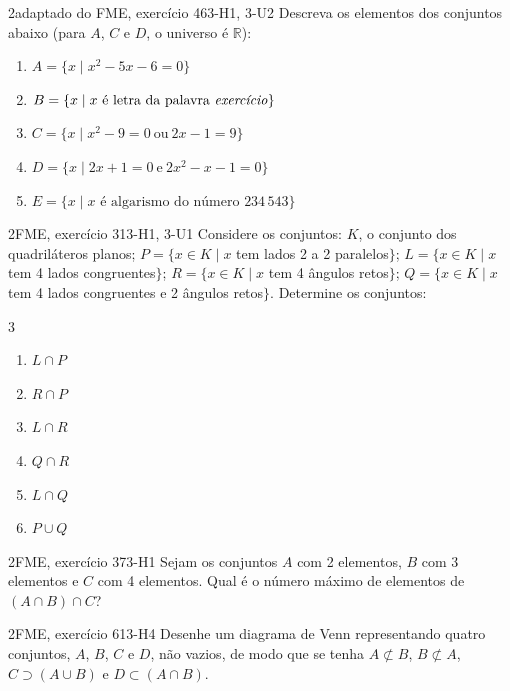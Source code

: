 \begin{questao}[integradora]{2}{adaptado do FME, exercício 46}{3-H1, 3-U2}\label{u3:fme46}
Descreva os elementos dos conjuntos abaixo (para $A$, $C$ e $D$, o universo é $\mathbb{R}$):
\begin{enumerate}[label={}, leftmargin=1.2em, itemsep=1pt]
  \item $A=\{x\mid x^2-5x-6=0\}$
  \item $B=\{x\mid x\text{ é letra da palavra \emph{exercício}}\}$
  \item $C=\{x\mid x^2-9=0\ \text{ou}\ 2x-1=9\}$
  \item $D=\{x\mid 2x+1=0\ \text{e}\ 2x^2-x-1=0\}$
  \item $E=\{x\mid x\text{ é algarismo do número }234\,543\}$
\end{enumerate}
\end{questao}

\begin{questao}[integradora]{2}{FME, exercício 31}{3-H1, 3-U1}\label{u3:fme31}
Considere os conjuntos: $K$, o conjunto dos quadriláteros planos; $P=\{x\in K\mid x$ tem lados 2 a 2 paralelos$\}$; $L=\{x\in K\mid x$ tem 4 lados congruentes$\}$; $R=\{x\in K\mid x$ tem 4 ângulos retos$\}$; $Q=\{x\in K\mid x$ tem 4 lados congruentes e 2 ângulos retos$\}$. Determine os conjuntos:
\begin{multicols}{3}
\begin{enumerate}[label=\alph*)]
  \item $L\cap P$
  \item $R\cap P$
  \item $L\cap R$
  \item $Q\cap R$
  \item $L\cap Q$
  \item $P\cup Q$
\end{enumerate}
\end{multicols}
\end{questao}



\begin{questao}{2}{FME, exercício 37}{3-H1}\label{u3:fme37}
Sejam os conjuntos $A$ com 2 elementos, $B$ com 3 elementos e $C$ com 4 elementos. Qual é o número máximo de elementos de $(A\cap B)\cap C$?
\end{questao}

\begin{questao}{2}{FME, exercício 61}{3-H4}\label{u3:fme61}
Desenhe um diagrama de Venn representando quatro conjuntos, $A$, $B$, $C$ e $D$, não vazios, de modo que se tenha $A\not\subset B$, $B\not\subset A$, $C\supset(A\cup B)$ e $D\subset(A\cap B)$.
\end{questao}



